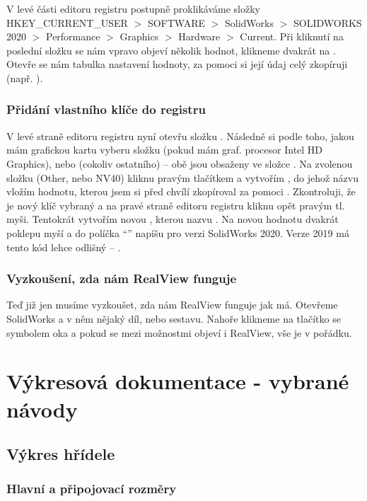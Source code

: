 V levé části editoru registru postupně proklikáváme složky \newline HKEY\_CURRENT\_USER $>$ SOFTWARE $>$ SolidWorks $>$ SOLIDWORKS 2020 $>$ Performance $>$ Graphics $>$ Hardware $>$ Current.
Při kliknutí na poslední složku se nám vpravo objeví několik hodnot, klikneme dvakrát na .
Otevře se nám tabulka nastavení hodnoty, za pomoci  si její údaj celý zkopíruji (např. ).

\subsection*{Přidání vlastního klíče do registru}
V levé straně editoru registru nyní otevřu složku .
Následně si podle toho, jakou mám grafickou kartu vyberu složku  (pokud mám graf. procesor Intel HD Graphics), nebo  (cokoliv ostatního) -- obě jsou obsaženy ve složce .
Na zvolenou složku (Other, nebo NV40) kliknu pravým tlačítkem a vytvořím , do jehož názvu vložím hodnotu, kterou jsem si před chvílí zkopíroval za pomoci .
Zkontroluji, že je nový klíč vybraný a na pravé straně editoru registru kliknu opět pravým tl. myši.
Tentokrát vytvořím novou , kterou nazvu .
Na novou hodnotu dvakrát poklepu myší a do políčka \enquote{} napíšu  pro verzi SolidWorks 2020.
Verze 2019 má tento kód lehce odlišný -- .

\subsection*{Vyzkoušení, zda nám RealView funguje}
Teď již jen musíme vyzkoušet, zda nám RealView funguje jak má.
Otevřeme SolidWorks a v něm nějaký díl, nebo sestavu.
Nahoře klikneme na tlačítko se symbolem oka a pokud se mezi možnostmi objeví i RealView, vše je v pořádku. 

\chapter{Výkresová dokumentace - vybrané návody}

\section{Výkres hřídele}

\subsection{Hlavní a připojovací rozměry}

